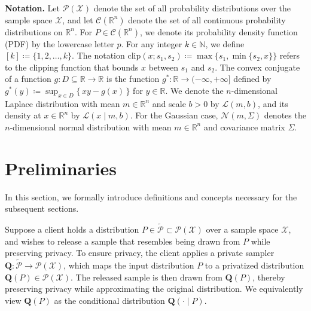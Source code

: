 \documentclass[accepted]{article}
\theoremstyle{plain} %
\theoremstyle{definition}
\theoremstyle{remark}
\newcommand{\bQ}{\mathbf{Q}}
\newcommand{\R}{\mathbb{R}}
\begin{document}
\textbf{Notation.} Let $\mathcal{P}(\mathcal{X})$ denote the set of all probability distributions over the sample space $\mathcal{X}$, and let $\mathcal{C}(\mathbb{R}^n)$ denote the set of all continuous probability distributions on $\mathbb{R}^n$. For $P\in \mathcal{C}(\mathbb{R}^n)$, we denote its probability density function (PDF) by the lowercase letter $p$. For any integer $k \in \mathbb{N}$, we define $[k] \coloneqq \{1, 2, \dots, k\}$. The notation $\mathrm{clip}(x; s_1, s_2) \coloneqq \max\{s_1, \min\{s_2, x\}\}$ refers to the clipping function that bounds $x$ between $s_1$ and $s_2$.
 The convex conjugate of a function $g:D\subseteq\mathbb{R}\to\mathbb{R}$ is the function $g^*:\mathbb{R}\to(-\infty,+\infty]$ defined by $g^*(y) \coloneqq \sup_{x\in D} \{\, xy - g(x) \,\}$ for $y\in\mathbb{R}$.
We denote the \( n \)-dimensional Laplace distribution with mean \( m \in \mathbb{R}^n \) and scale \( b > 0 \) by \( \mathcal{L}(m, b) \), and its density at \( x \in \mathbb{R}^n \) by \( \mathcal{L}(x \mid m, b) \). For the Gaussian case, \( \mathcal{N}(m, \Sigma) \) denotes the \( n \)-dimensional normal distribution with mean \( m \in \R^n\) and covariance matrix \( \Sigma \).

\vspace{0.1cm}
\section{Preliminaries}\label{sec: prilim}
\vspace{0.1cm}
In this section, we formally introduce definitions and concepts necessary for the subsequent sections.


Suppose a client holds a distribution \( P \in \tilde{\mathcal{P}} \subset \mathcal{P}(\mathcal{X}) \) over a sample space \( \mathcal{X} \), and wishes to release a sample that resembles being drawn from \( P \) while preserving privacy. To ensure privacy, the client applies a private sampler \( \mathbf{Q}: \tilde{\mathcal{P}} \to \mathcal{P}(\mathcal{X}) \), which maps the input distribution \( P \) to a privatized distribution \( \mathbf{Q}(P) \in \mathcal{P}(\mathcal{X}) \). The released sample is then drawn from \( \mathbf{Q}(P) \), thereby preserving privacy while approximating the original distribution. We equivalently view \( \mathbf{Q}(P) \) as the conditional distribution \( \mathbf{Q}(\cdot \mid P) \).
\end{document}
